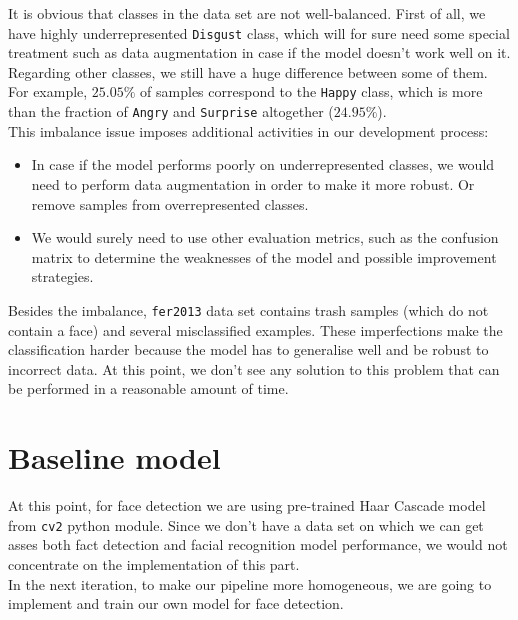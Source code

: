 It is obvious that classes in the data set are not well-balanced. First of all, we have highly underrepresented \texttt{Disgust} class, which will for sure need some special treatment such as data augmentation in case if the model doesn't work well on it.\\

Regarding other classes, we still have a huge difference between some of them. For example, $25.05\%$ of samples correspond to the \texttt{Happy} class, which is more than the fraction of \texttt{Angry} and \texttt{Surprise} altogether ($24.95\%$).\\ 

This imbalance issue imposes additional activities in our development process:

\begin{itemize}
    \item 
    In case if the model performs poorly on underrepresented classes, we would need to perform data augmentation in order to make it more robust. Or remove samples from overrepresented classes.
    \item
    We would surely need to use other evaluation metrics, such as the confusion matrix to determine the weaknesses of the model and possible improvement strategies.
\end{itemize}

Besides the imbalance, \texttt{fer2013} data set contains trash samples (which do not contain a face) and several misclassified examples. These imperfections make the classification harder because the model has to generalise well and be robust to incorrect data. At this point, we don't see any solution to this problem that can be performed in a reasonable amount of time.

\section{Baseline model}


At this point, for face detection we are using pre-trained Haar Cascade model from \texttt{cv2} python module. Since we don't have a data set on which we can get asses both fact detection and facial recognition model performance, we would not concentrate on the implementation of this part.\\

In the next iteration, to make our pipeline more homogeneous, we are going to implement and train our own model for face detection.\\

